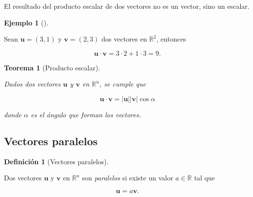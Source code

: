 \documentclass[
  a4paper,
]{scrreport}
\theoremstyle{definition}
\newtheorem{example}{Ejemplo}[chapter]
\theoremstyle{plain}
\theoremstyle{plain}
\newtheorem{theorem}{Teorema}[chapter]
\theoremstyle{plain}
\theoremstyle{definition}
\newtheorem{definition}{Definición}[chapter]
\theoremstyle{remark}
\begin{document}
\begin{tcolorbox}[enhanced jigsaw, rightrule=.15mm, colframe=quarto-callout-warning-color-frame, arc=.35mm, leftrule=.75mm, colbacktitle=quarto-callout-warning-color!10!white, bottomrule=.15mm, toptitle=1mm, breakable, opacitybacktitle=0.6, coltitle=black, left=2mm, colback=white, titlerule=0mm, opacityback=0, title=\textcolor{quarto-callout-warning-color}{\faExclamationTriangle}\hspace{0.5em}{Advertencia}, toprule=.15mm, bottomtitle=1mm]

El resultado del producto escalar de dos vectores no es un vector, sino
un escalar.

\end{tcolorbox}

\begin{example}[]\protect\hypertarget{exm-producto-escalar}{}\label{exm-producto-escalar}

Sean \(\mathbf{u}=(3,1)\) y \(\mathbf{v}=(2,3)\) dos vectores en
\(\mathbb{R}^2\), entonces

\[
\mathbf{u}\cdot\mathbf{v} = 3\cdot 2 +1\cdot 3 = 9.
\]

\end{example}

\begin{theorem}[Producto
escalar]\protect\hypertarget{thm-producto-escalar}{}\label{thm-producto-escalar}

Dados dos vectores \(\mathbf{u}\) y \(\mathbf{v}\) en \(\mathbb{R}^n\),
se cumple que

\[
\mathbf{u}\cdot\mathbf{v} =  \lvert \mathbf{u}\rvert \lvert\mathbf{v}\rvert \cos\alpha
\]

donde \(\alpha\) es el ángulo que forman los vectores.

\end{theorem}

\hypertarget{vectores-paralelos}{%
\subsection{Vectores paralelos}\label{vectores-paralelos}}

\begin{definition}[Vectores
paralelos]\protect\hypertarget{def-vectores-paralelos}{}\label{def-vectores-paralelos}

Dos vectores \(\mathbf{u}\) y \(\mathbf{v}\) en \(\mathbb{R}^n\) son
\emph{paralelos} si existe un valor \(a\in\mathbb{R}\) tal que

\[
\mathbf{u} = a\mathbf{v}.
\]

\end{definition}
\end{document}
